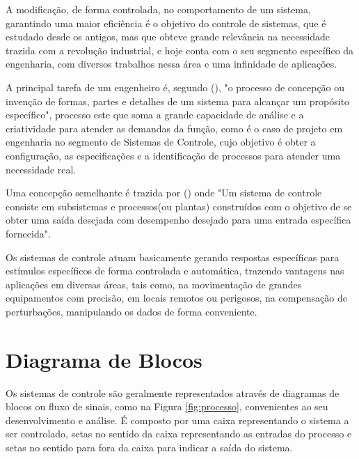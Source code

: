A modificação, de forma controlada, no comportamento de um sistema, 
garantindo uma maior eficiência é o objetivo do controle de sistemas,
que é estudado desde os antigos, mas que obteve grande relevância na necessidade trazida com a revolução industrial, 
e hoje conta com o seu segmento específico da engenharia, com diversos trabalhos nessa área e uma infinidade de aplicações. 
 

A principal tarefa de um engenheiro é, segundo \citeauthor{dorf2011modern}(\citeyear{dorf2011modern}), 
"o processo de concepção ou invenção de formas, partes e detalhes de um sistema para alcançar um propósito específico", 
processo este que soma a grande capacidade de análise e a criatividade para atender as demandas da função, 
como é o caso de projeto em engenharia no segmento de Sistemas de Controle, 
cujo objetivo é obter a configuração, as especificações e a identificação de processos para atender uma necessidade real. 


Uma concepção semelhante é trazida por \citeauthor{nise2009engenharia}(\citeyear{nise2009engenharia}) onde "Um sistema de controle consiste em subsistemas e processos(ou plantas) construídos com o objetivo de se obter uma saída desejada com desempenho desejado para uma entrada específica fornecida".


Os sistemas de controle atuam basicamente gerando respostas específicas para estímulos específicos de forma controlada e automática, 
trazendo vantagens nas aplicações em diversas áreas, tais como, 
na movimentação de grandes equipamentos com precisão, 
em locais remotos ou perigosos, 
na compensação de perturbações, 
manipulando os dados de forma conveniente.





\section{Diagrama de Blocos}



Os sistemas de controle são geralmente representados através de diagramas de blocos ou fluxo de sinais, 
como na Figura \ref{fig:processo}, 
convenientes ao seu desenvolvimento e análise. 
É composto por uma caixa representando o sistema a ser controlado, 
setas no sentido da caixa representando as entradas do processo e setas no sentido para fora da caixa para indicar a saída do sistema.


